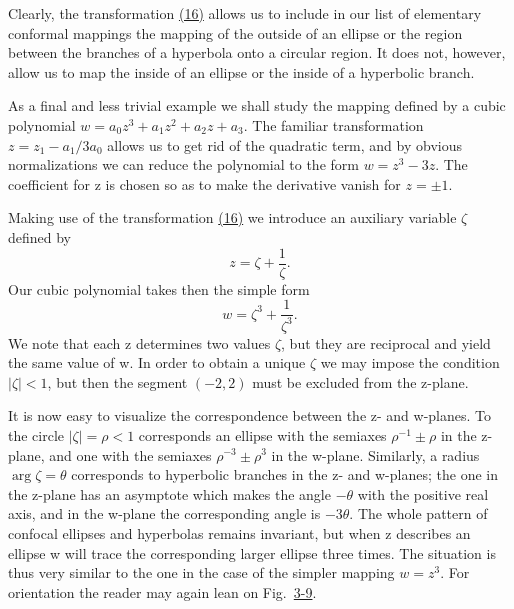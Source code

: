 Clearly, the transformation \hyperref[eq:3.16]{(16)} allows us to include in our list of elementary conformal mappings the mapping of the outside of an ellipse or the region between the branches of a hyperbola onto a circular region. It does not, however, allow us to map the inside of an ellipse or the inside of a hyperbolic branch.

As a final and less trivial example we shall study the mapping defined by a cubic polynomial $w = a_{0}z^{3} + a_{1}z^{2} + a_{2}z + a_{3}$. The familiar transformation $z = z_{1} - a_{1}/3a_{0}$ allows us to get rid of the quadratic term,
and by obvious normalizations we can reduce the polynomial to the form $w = z^{3} - 3z$. The coefficient for z is chosen so as to make the derivative vanish for $z = \pm 1$.

Making use of the transformation \hyperref[eq:3.16]{(16)} we introduce an auxiliary variable $\zeta$ defined by
\begin{equation*}
z = \zeta + \frac {1}{\zeta}.
\end{equation*}
Our cubic polynomial takes then the simple form
\begin{equation*}
w = \zeta^ {3} + \frac {1}{\zeta^ {3}}.
\end{equation*}
We note that each z determines two values $\zeta$, but they are reciprocal and yield the same value of w. In order to obtain a unique $\zeta$ we may impose the condition $|\zeta| < 1$, but then the segment $(-2,2)$ must be excluded from the z-plane.

It is now easy to visualize the correspondence between the z- and w-planes. To the circle $|\zeta| = \rho < 1$ corresponds an ellipse with the semiaxes $\rho^{-1} \pm \rho$ in the z-plane, and one with the semiaxes $\rho^{-3} \pm \rho^{3}$ in the w-plane. Similarly, a radius $\arg \zeta = \theta$ corresponds to hyperbolic branches in the z- and w-planes; the one in the z-plane has an asymptote which makes the angle $-\theta$ with the positive real axis, and in the w-plane the corresponding angle is $-3\theta$. The whole pattern of confocal ellipses and hyperbolas remains invariant, but when z describes an ellipse w will trace the corresponding larger ellipse three times. The situation is thus very similar to the one in the case of the simpler mapping $w = z^{3}$. For orientation the reader may again lean on Fig.~\hyperref[fig:3-9]{3-9}.

